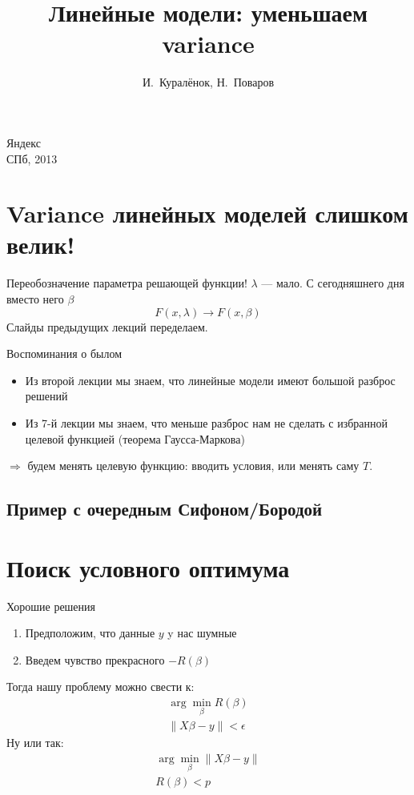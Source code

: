 \documentclass[14pt, fleqn, xcolor={dvipsnames, table}]{beamer}
\title{Линейные модели: уменьшаем variance\\\small{}}
\author[]{\small{%
И.~Куралёнок,
Н.~Поваров}}
\date{}
\begin{document}
\begin{frame}
\maketitle
\small
\begin{center}
\vspace{-60pt}
\normalsize {\color{red}Я}ндекс \\
\vspace{80pt}
\footnotesize СПб, 2013
\end{center}
\end{frame}

\section{Variance линейных моделей слишком велик!}
\begin{frame}{Переобозначение параметра решающей функции!}
$\lambda$ --- мало. С сегодняшнего дня вместо него $\beta$
$$
F(x, \lambda) \to F(x, \beta)
$$
Слайды предыдущих лекций переделаем.
\end{frame}

\begin{frame}{Воспоминания о былом}
\begin{itemize}
  \item Из второй лекции мы знаем, что линейные модели имеют большой разброс решений
  \item Из 7-й лекции мы знаем, что меньше разброс нам не сделать с избранной целевой функцией (теорема Гаусса-Маркова)
\end{itemize}
$\Rightarrow$ будем менять целевую функцию: вводить условия, или менять саму $T$.
\end{frame}

\subsection{Пример с очередным Сифоном/Бородой}
\section{Поиск условного оптимума}
\begin{frame}{Хорошие решения}
\begin{enumerate}
  \item Предположим, что данные $y$ y нас шумные
  \item Введем чувство прекрасного $-R(\beta)$ 
\end{enumerate}
Тогда нашу проблему можно свести к:
$$\begin{array}{l}
\arg \min_\beta R(\beta) \\
\| X\beta - y\| < \epsilon
\end{array}$$
Ну или так:
$$\begin{array}{l}
\arg \min_\beta \| X\beta - y\| \\
R(\beta) < p
\end{array}$$
\end{frame}
\end{document}
